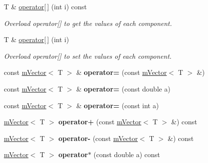 \begin{DoxyCompactItemize}
T \& \hyperlink{classmVector_a581f723f77bfafe89a26942ae77db72b}{operator\mbox{[}$\,$\mbox{]}} (int i) const
\begin{DoxyCompactList}\small\item\em Overload operator\mbox{[}\mbox{]} to get the values of each component. \end{DoxyCompactList}\item 
\mbox{\label{classmVector_a9781cbcdf3f20d12733931a2d13fe8ba}} 
T \& \hyperlink{classmVector_a9781cbcdf3f20d12733931a2d13fe8ba}{operator\mbox{[}$\,$\mbox{]}} (int i)
\begin{DoxyCompactList}\small\item\em Overload operator\mbox{[}\mbox{]} to set the values of each component. \end{DoxyCompactList}\item 
\mbox{\label{classmVector_a72fe5fa0dba80fa66db60cd9de193cd1}} 
const \hyperlink{classmVector}{m\+Vector}$<$ T $>$ \& {\bfseries operator=} (const \hyperlink{classmVector}{m\+Vector}$<$ T $>$ \&)
\item 
\mbox{\label{classmVector_a8ef57587cf78397b691a4224888c5642}} 
const \hyperlink{classmVector}{m\+Vector}$<$ T $>$ \& {\bfseries operator=} (const double a)
\item 
\mbox{\label{classmVector_a6b10da03a9f71e52602c93e8c37244fe}} 
const \hyperlink{classmVector}{m\+Vector}$<$ T $>$ \& {\bfseries operator=} (const int a)
\item 
\mbox{\label{classmVector_a3e2f1db0d2dd271d7f136abdf203de34}} 
\hyperlink{classmVector}{m\+Vector}$<$ T $>$ {\bfseries operator+} (const \hyperlink{classmVector}{m\+Vector}$<$ T $>$ \&) const
\item 
\mbox{\label{classmVector_a1fe65d2315fe86252617f71d889b3eff}} 
\hyperlink{classmVector}{m\+Vector}$<$ T $>$ {\bfseries operator-\/} (const \hyperlink{classmVector}{m\+Vector}$<$ T $>$ \&) const
\item 
\mbox{\label{classmVector_a0c3388b7ed8b4b93530fb320e6d00820}} 
\hyperlink{classmVector}{m\+Vector}$<$ T $>$ {\bfseries operator$\ast$} (const double a) const
\end{DoxyCompactItemize}
